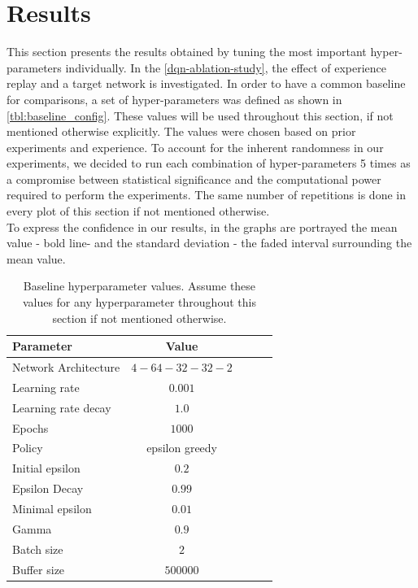 \documentclass{article}
\begin{document}
\section{Results}
\label{sec:results}
This section presents the results obtained by tuning the most important hyper-parameters individually. 
In the \autoref{dqn-ablation-study}, the effect of experience replay and a target network is investigated.
In order to have a common baseline for comparisons, a set of hyper-parameters was defined as shown in \autoref{tbl:baseline_config}. 
These values will be used throughout this section, if not mentioned otherwise explicitly.
The values were chosen based on prior experiments and experience.
To account for the inherent randomness in our experiments,
we decided to run each combination of hyper-parameters 5 times as a compromise between statistical significance and the computational power required to perform the experiments. The same number of repetitions is done in every plot of this section if not mentioned otherwise.\\
To express the confidence in our results, in the graphs are portrayed the mean value - bold line- and the standard deviation - the faded interval surrounding the mean value.   

\begin{table}[ht]
   \caption{Baseline hyperparameter values. Assume these values for any hyperparameter throughout this section if not mentioned otherwise.}
   \label{tbl:baseline_config}
   \vskip 0.15in
   \begin{center}
   \begin{small}
   \begin{sc}
   \begin{tabular}{lcccr}
   \toprule
   Parameter & Value \\
   \midrule
   Network Architecture    & $4-64-32-32-2$ \\
   Learning rate           & $0.001$ \\
   Learning rate decay     & $1.0$   \\
   Epochs                  & $1000$ \\
   Policy                  & epsilon greedy \\
   Initial epsilon         & $0.2$ \\
   Epsilon Decay           & $0.99$ \\
   Minimal epsilon         & $0.01$ \\
   Gamma                   & $0.9$ \\
   Batch size              & $2$ \\
   Buffer size             & $500000$ \\
   \bottomrule
   \end{tabular}
   \end{sc}
   \end{small}
   \end{center}
   \vskip -0.1in
\end{table}
\end{document}
